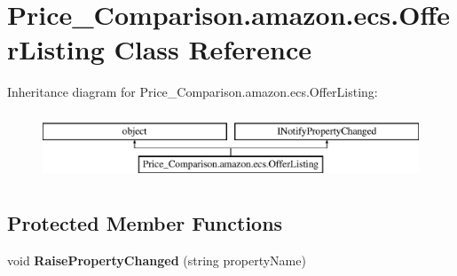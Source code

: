 \hypertarget{class_price___comparison_1_1amazon_1_1ecs_1_1_offer_listing}{\section{Price\-\_\-\-Comparison.\-amazon.\-ecs.\-Offer\-Listing Class Reference}
\label{class_price___comparison_1_1amazon_1_1ecs_1_1_offer_listing}
}


 


Inheritance diagram for Price\-\_\-\-Comparison.\-amazon.\-ecs.\-Offer\-Listing\-:\begin{figure}[H]
\begin{center}
\leavevmode
\includegraphics[height=2.000000cm]{class_price___comparison_1_1amazon_1_1ecs_1_1_offer_listing}
\end{center}
\end{figure}
\subsection*{Protected Member Functions}
\begin{DoxyCompactItemize}
\item 
\hypertarget{class_price___comparison_1_1amazon_1_1ecs_1_1_offer_listing_a85b35b995d489dbb92b3fc6218e58f8b}{void {\bfseries Raise\-Property\-Changed} (string property\-Name)}\label{class_price___comparison_1_1amazon_1_1ecs_1_1_offer_listing_a85b35b995d489dbb92b3fc6218e58f8b}

\end{DoxyCompactItemize}
